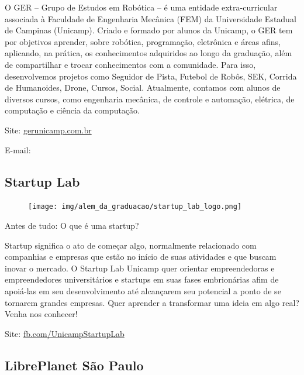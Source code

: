 O GER – Grupo de Estudos em Robótica – é uma entidade extra-curricular
associada à Faculdade de Engenharia Mecânica (FEM) da Universidade Estadual
de Campinas (Unicamp). Criado e formado por alunos da Unicamp, o GER tem por
objetivos aprender, sobre robótica, programação, eletrônica e áreas afins,
aplicando, na prática, os conhecimentos adquiridos ao longo da graduação,
além de compartilhar e trocar conhecimentos com a comunidade. Para isso,
desenvolvemos projetos como Seguidor de Pista, Futebol de Robôs, SEK, Corrida
de Humanoides, Drone, Cursos, Social. Atualmente, contamos com alunos de
diversos cursos, como engenharia mecânica, de controle e automação, elétrica,
de computação e ciência da computação.

\begin{compactitemize}
\item Site: \url{gerunicamp.com.br}
\item E-mail: 
\end{compactitemize}


\subsection{Startup Lab}

\begin{figure}[h!]
  \centering
  \texttt{[image: img/alem\_da\_graduacao/startup\_lab\_logo.png]}
\end{figure}

Antes de tudo: O que é uma startup?

Startup significa o ato de começar algo, normalmente relacionado com companhias
e empresas que estão no início de suas atividades e que buscam inovar o
mercado. O Startup Lab Unicamp quer orientar empreendedoras e empreendedores
universitários e startups em suas fases embrionárias afim de apoiá-las em seu
desenvolvimento até alcançarem seu potencial a ponto de se tornarem grandes
empresas. Quer aprender a transformar uma ideia em algo real? Venha nos
conhecer!

\begin{compactitemize}
\item Site: \url{fb.com/UnicampStartupLab}
\end{compactitemize}


\subsection{LibrePlanet São Paulo}

